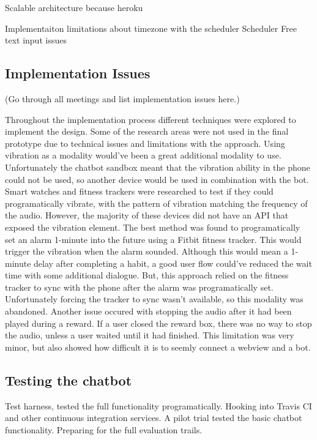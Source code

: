 Scalable architecture because heroku\newline

Implementaiton limitations about timezone with the scheduler\newline
Scheduler\newline
Free text input issues\newline

\subsection{Implementation Issues}
(Go through all meetings and list implementation issues here.)

Throughout the implementation process different techniques were explored to implement the design.
Some of the research areas were not used in the final prototype due to technical issues and limitations with the approach.\newline
\newline
Using vibration as a modality would've been a great additional modality to use.
Unfortunately the chatbot sandbox meant that the vibration ability in the phone could not be used, so another device would be used in combination with the bot.
Smart watches and fitness trackers were researched to test if they could programatically vibrate, with the pattern of vibration matching the frequency of the audio.
However, the majority of these devices did not have an API that exposed the vibration element. The best method was found to programatically set an alarm 1-minute into the future using a Fitbit fitness tracker.
This would trigger the vibration when the alarm sounded.
Although this would mean a 1-minute delay after completing a habit, a good user flow could've reduced the wait time with some additional dialogue.
But, this approach relied on the fitness tracker to sync with the phone after the alarm was programatically set. Unfortunately forcing the tracker to sync wasn't available, so this modality was abandoned.\newline
\newline
Another issue occured with stopping the audio after it had been played during a reward. If a user closed the reward box, there was no way to stop the audio, unless a user waited until it had finished. This limitation was very minor, but also showed how difficult it is to seemly connect a webview and a bot.


\subsection{Testing the chatbot}

Test harness, tested the full functionality programatically. Hooking into Travis CI and other continuous integration services.
A pilot trial tested the basic chatbot functionality. Preparing for the full evaluation trails.

\newpage